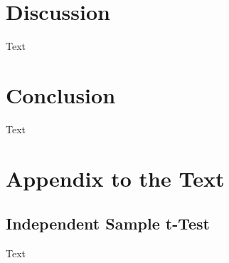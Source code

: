 \documentclass[11pt,a4paper,oneside]{report}
\begin{document}
\chapter{Discussion}



Text


\chapter{Conclusion}

Text




\newpage

\setcounter{page}{8}



\newpage
\appendix


\chapter{Appendix to the Text}





\section{Independent Sample t-Test}

Text



\newpage

%
\end{document}
